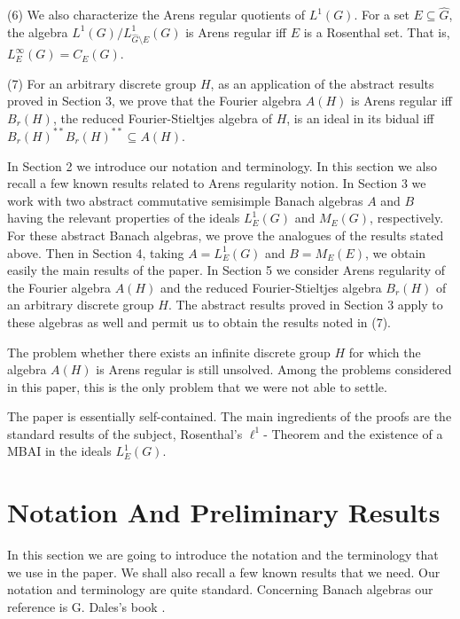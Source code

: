 \documentclass[12pt, twoside, leqno]{article}
\theoremstyle{definition}
\theoremstyle{definition}
\numberwithin{equation}{section}
\begin{document}
(6) We also characterize the Arens regular quotients of $ L^{1}(G) $. For a set $ E\subseteq\hat{G} $, the algebra $ L^{1}(G)/L^{1}_{\hat{G}\setminus E}(G) $ is Arens regular iff $ E $ is a Rosenthal set. That is, $ L^{\infty}_{E}(G)=C_{E}(G) $.\vspace{2mm}

(7) For an arbitrary discrete group $H$, as an application of the abstract results proved in Section 3, we prove that the Fourier algebra $A(H)$ is Arens regular iff $B_{r}(H)$, the reduced Fourier-Stieltjes algebra of $H$, is an ideal in its bidual iff $B_{r}(H)^{**}B_{r}(H)^{**}\subseteq A(H)$.\vspace{2mm}


In Section 2 we introduce our notation and terminology. In this section we also recall a few known results related to Arens regularity notion. In Section 3 we work with two abstract commutative semisimple Banach algebras $ A $ and $ B $ having the relevant properties of the ideals $ L_{E}^{1}(G) $ and $ M_{E}(G) $, respectively. For these abstract Banach algebras, we prove the analogues of the results stated above. Then in Section 4, taking $ A=L_{E}^{1}(G) $ and $ B=M_{E}(E) $, we obtain easily the main results of the paper. In Section 5 we consider Arens regularity of the Fourier algebra $ A(H) $ and the reduced Fourier-Stieltjes algebra $ B_{r}(H) $ of an arbitrary discrete group $ H $. The abstract results proved in Section 3 apply to these algebras as well and permit us to obtain the results noted in (7).\vspace{2mm}


\noindent The problem whether there exists an infinite discrete group $ H $ for which the algebra $ A(H) $ is Arens regular is still unsolved. Among the problems considered in this paper, this is the only problem that we were not able to settle. \vspace{2mm}

The paper is essentially self-contained. The main ingredients of the proofs are the standard results of the subject, Rosenthal's $ \ell^{1} $- Theorem and the existence of a MBAI in the ideals $ L^{1}_{E}(G) $. \vspace{2mm}

 \section{Notation And Preliminary Results}
In this section we are going to introduce the notation and the terminology that we use in the paper. We shall also recall a few known results that we need. Our notation and terminology are quite standard. Concerning Banach algebras our reference is G. Dales's book \cite {Dales_01}.\vspace{2mm}
\end{document}
